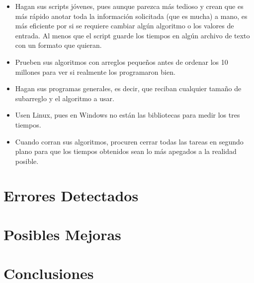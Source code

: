 \documentclass[12pt, fleqn]{article}                             %
\theoremstyle{break}                                            %
\begin{document}
\begin{itemize}
                \begin{itemize}\setlength\itemsep{0em}
                    \item Hagan sus scripts jóvenes, pues aunque parezca más tedioso y crean que es más rápido anotar toda la información solicitada (que es mucha) a mano, es más eficiente por si se requiere cambiar algún algoritmo o los valores de entrada. Al menos que el script guarde los tiempos en algún archivo de texto con un formato que quieran.
                    \item Prueben sus algoritmos con arreglos pequeños antes de ordenar los 10 millones para ver si realmente los programaron bien.
                    \item Hagan sus programas generales, es decir, que reciban cualquier tamaño de subarreglo y el algoritmo a usar.
                    \item Usen Linux, pues en Windows no están las bibliotecas para medir los tres tiempos.
                    \item Cuando corran sus algoritmos, procuren cerrar todas las tareas en segundo plano para que los tiempos obtenidos sean lo más apegados a la realidad posible.
                \end{itemize}

        \end{itemize}




\clearpage
\section{Errores Detectados}



\clearpage
\section{Posibles Mejoras}



\clearpage
\section{Conclusiones}
\end{document}
